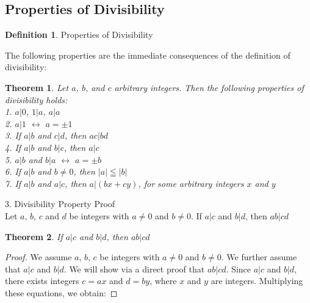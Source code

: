 \documentclass{book}
\newtheorem{theorem}{Theorem}[section]
\theoremstyle{definition}
\newtheorem{definition}{Definition}[section]
\theoremstyle{remark}
\begin{document}
\subsection{Properties of Divisibility}
\begin{definition}
Properties of Divisibility

The following properties are the immediate consequences of the definition of divisibility: 

\begin{tcolorbox}
	\begin{theorem}
		Let $a$, $b$, and $c$ arbitrary integers. Then the following properties of divisibility holds: \\
		1. $a | 0$, $1 | a$, $a | a$  \\
		2. $a | 1$ $\leftrightarrow$ $a = \pm 1$ \\
		3. If $a | b$ and $c | d$, then $ac | bd$ \\
		4. If $a | b$ and $b | c$, then $a | c$ \\
		5. $a | b$ and $b | a$ $\leftrightarrow$ $a = \pm b$ \\
		6. If $a | b$ and $b \neq 0$, then $|a| \leqq |b|$ \\
		7. If $a | b$ and $a | c$, then $a | (bx + cy)$, for some arbitrary integers $x$ and $y$ \\ 
		
	\end{theorem}
\end{tcolorbox}





3. Divisibility Property Proof \\

Let $a$, $b$, $c$ and $d$ be integers with $a \neq 0$ and $b \neq 0$. If $a | c$ and $b | d$, then $ab | cd$ \\

\begin{tcolorbox}
	\begin{theorem}
		If $a | c$ and $b | d$, then $ab | cd$
	\end{theorem}
\end{tcolorbox}

\begin{proof}
We assume $a$, $b$, $c$ be integers with $a \neq 0$ and $b\neq 0$. We further assume that $a | c$ and $b | d$. We will show via a direct proof that $ab | cd$. Since $a | c$ and $b | d$, there exists integers $c = ax$ and $d = by$, where $x$ and $y$ are integers. Multiplying these equations, we obtain: 


\end{proof}
\end{definition}
\end{document}
